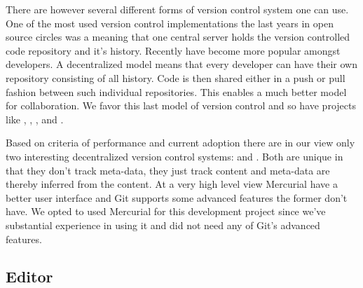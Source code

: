There are however several different forms of version control system one can
use. One of the most used version control implementations the last years
in open source circles was
%
\dash{}a  meaning that one central
server holds the version controlled code repository and it's history.%
Recently  have become more popular
amongst developers. A decentralized model means that every developer can have
their own repository consisting of all history.%
Code is then shared either in a push or pull fashion between such individual
repositories. This enables a much better model for collaboration.
We favor this last model of version control and so have projects
like , , ,
and .%

Based on criteria of performance and current adoption there are in our view
only two interesting decentralized version control systems:
%
and %
. Both are unique in that they don't track meta-data, they just track
content and meta-data are thereby inferred from the content.
At a very high level view Mercurial have a better user interface and Git
supports some advanced features the former don't have. We opted to used
Mercurial for this development project since we've substantial experience in
using it and did not need any of Git's advanced features.

\subsection{Editor}

